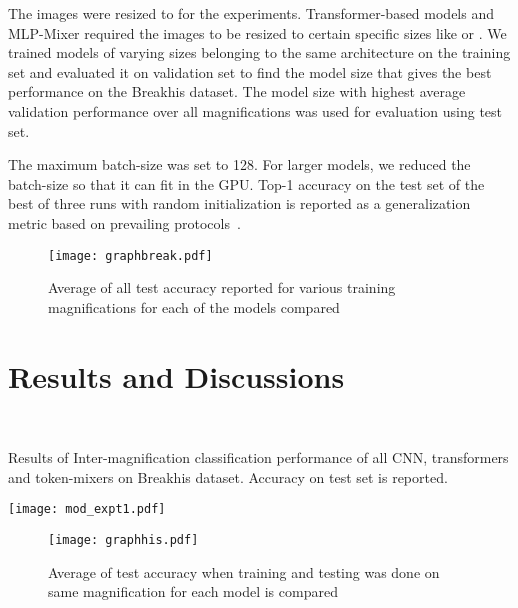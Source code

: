 \documentclass[nohyperref]{article}
\theoremstyle{plain}
\theoremstyle{definition}
\theoremstyle{remark}
\begin{document}
The images were resized to  for the experiments. Transformer-based models and MLP-Mixer required the images to be resized to certain specific sizes like  or . We trained models of varying sizes belonging to the same architecture on the training set and evaluated it on validation set to find the model size that gives the best performance on the Breakhis \cite{spanhol2015dataset} dataset. The model size with highest average validation performance over all magnifications was used for evaluation using test set.

The maximum batch-size was set to 128. For larger models, we reduced the batch-size so that it can fit in the GPU. Top-1 accuracy on the test set of the best of three runs with random initialization is reported as a generalization metric based on prevailing protocols~\cite{hassani2021escaping}. 

\begin{figure}[ht]
\vskip 0.2in
\begin{center}
\texttt{[image: graphbreak.pdf]}
\caption{Average of all test accuracy reported for various training magnifications for each of the models compared}
\label{fig:test}
\end{center}
\vskip -0.2in
\end{figure}

\section{Results and Discussions}



\
\begin{table*}[]
\centering
\caption{Results of Inter-magnification classification performance of all CNN, transformers and token-mixers on Breakhis \cite{spanhol2015dataset} dataset. Accuracy on test set is reported.}
\vspace{0.5 cm}
\centering

\texttt{[image: mod\_expt1.pdf]}
\label{tab:result}
\end{table*}

\begin{figure}[ht]
\vskip 0.2in
\begin{center}
\texttt{[image: graphhis.pdf]}
\caption{Average of test accuracy when training and testing was done on same magnification for each model is compared}
\label{fig:diag}
\end{center}
\vskip -0.2in
\end{figure}
\end{document}
